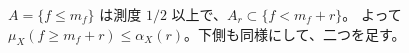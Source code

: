 $A = \{f \le m_f\}$ は測度 $1/2$ 以上で、$A_r \subset \{f < m_f + r\}$。
よって $\mu_X(f \ge m_f + r) \le \alpha_X(r)$。下側も同様にして、二つを足す。

